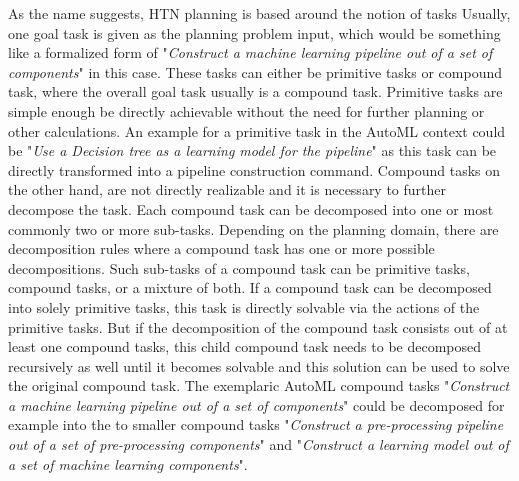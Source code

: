 As the name suggests, HTN planning is based around the notion of tasks
Usually, one goal task is given as the planning problem input, which would be something like a formalized form of "\textit{Construct a machine learning pipeline out of a set of components}" in this case.
These tasks can either be primitive tasks or compound task, where the overall goal task usually is a compound task.
Primitive tasks are simple enough be directly achievable without the need for further planning or other calculations.
An example for a primitive task in the AutoML context could be "\textit{Use a Decision tree as a learning model for the pipeline}" as this task can be directly transformed into a pipeline construction command.\newline
Compound tasks on the other hand, are not directly realizable and it is necessary to further decompose the task.
Each compound task can be decomposed into one or most commonly two or more sub-tasks.
Depending on the planning domain, there are decomposition rules where a compound task has one or more possible decompositions.
Such sub-tasks of a compound task can be primitive tasks, compound tasks, or a mixture of both.\newline
If a compound task can be decomposed into solely primitive tasks, this task is directly solvable via the actions of the primitive tasks.
But if the decomposition of the compound task consists out of at least one compound tasks, this child compound task needs to be decomposed recursively as well until it becomes solvable and this solution can be used to solve the original compound task.
The exemplaric AutoML compound tasks "\textit{Construct a machine learning pipeline out of a set of components}" could be decomposed for example into the to smaller compound tasks "\textit{Construct a pre-processing pipeline out of a set of pre-processing components}" and "\textit{Construct a learning model out of a set of machine learning components}".

